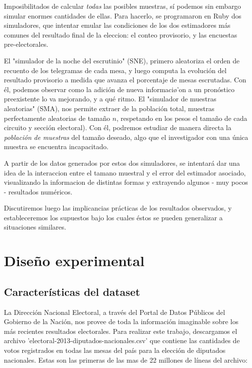 \documentclass[12pt, a4paper]{article}
\begin{document}
Imposibilitados de calcular \emph{todas} las posibles muestras, s\'i podemos sin embargo simular enormes cantidades de ellas. Para hacerlo, se programaron en Ruby dos simuladores, que intentar emular las condiciones de los  dos estimadores m\'as comunes del resultado final de la eleccion: el conteo provisorio, y las encuestas pre-electorales.

El "simulador de la noche del escrutinio" (SNE), primero aleatoriza el orden de recuento de los telegramas de cada mesa, y luego computa la evoluci\'on del resultado provisorio a medida que avanza el porcentaje de mesas escrutadas. Con \'el, podemos observar como la adici\'on de nueva informaci\o'on a un pron\'ostico preexistente lo va mejorando, y a qu\'e ritmo.
El "simulador de muestras aleatorias" (SMA), nos permite extraer de la poblaci\'on total, muestras perfectamente aleatorias de tama\~no $n$, respetando en los pesos el tama\~no de cada circuito y secci\'on electoral). Con \'el, podremos estudiar de manera directa la \emph{poblaci\'on de muestras} del tama\~no deseado, algo que el investigador con una \'unica muestra se encuentra incapacitado.

A partir de los datos generados por estos dos simuladores, se intentar\'a dar una idea de la interaccion entre el tamano muestral y el error del estimador asociado, visualizando la informacion de distintas formas y extrayendo algunos - muy pocos - resultados num\'ericos.

Discutiremos luego las implicancias pr\'acticas de los resultados observados, y estableceremos los supuestos bajo los cuales \'estos se pueden generalizar a situaciones similares.


\pagebreak

\section{Dise\~no experimental}

\subsection{Caracter\'isticas del dataset}

La Direcci\'on Nacional Electoral, a trav\'es del Portal de Datos P\'ublicos del Gobierno de la Naci\'on, nos provee de toda la informaci\'on imaginable sobre los m\'as recientes resultados electorales. Para realizar este trabajo, descargamos el archivo 'electoral-2013-diputados-nacionales.csv' que contiene las cantidades de votos registrados en todas las mesas del pa\'is para la elecci\'on de diputados nacionales. Estas son las primeras de las mas de 22 millones de l\'ineas del archivo:
\end{document}
